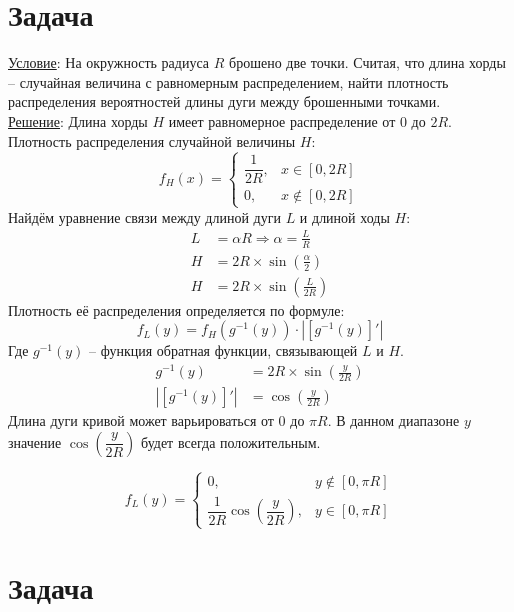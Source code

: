 \documentclass[a4paper,12pt]{article} %
\begin{document}
\newpage
\section{Задача}
\underline{Условие}: На окружность радиуса $R$ брошено две точки. Считая, что длина хорды – случайная величина с равномерным распределением, найти плотность распределения вероятностей длины дуги между брошенными точками.\\
\underline{Решение}:
Длина хорды $H$ имеет равномерное распределение от $0$ до $2R$. Плотность распределения случайной величины $H$:
\[
	f_H(x) =
	\begin{cases}
		\dfrac{1}{2R}, &x \in [0,2R]\\
		0, &x \notin [0, 2R]
	\end{cases}
\]
Найдём уравнение связи между длиной дуги $L$ и длиной ходы $H$:
\begin{align}
	L &= \alpha R \Rightarrow \alpha  = \frac{L}{R}\\
	H &= 2 R\times \sin\left(\frac{\alpha}{2}\right)\\
	H &= 2 R\times \sin\left(\frac{L}{2 R}\right)
\end{align}
Плотность её распределения определяется по формуле:
\[
	f_L(y) = f_H(g^{-1}(y))\cdot |[g^{-1}(y)]'|
\]
Где $g^{-1}(y)$ – функция обратная функции, связывающей $L$ и $H$.
\begin{align}
	g^{-1}(y) &= 2R\times \sin\left(\frac{y}{2R}\right)\\
	|[g^{-1}(y)]'| &= \cos\left(\frac{y}{2R}\right)
\end{align}
Длина дуги кривой может варьироваться от $0$ до $\pi  R$. В данном диапазоне $y$ значение $\cos\left(\dfrac{y}{2R}\right)$ будет всегда положительным.

\[
	f_L(y) =
	\begin{cases}
		0, &y\notin [0, \pi R]\\
		\dfrac{1}{2R}\cos\left(\dfrac{y}{2R}\right), &y\in [0, \pi  R]
	\end{cases}
\]
\newline

\section{Задача}
\end{document}
